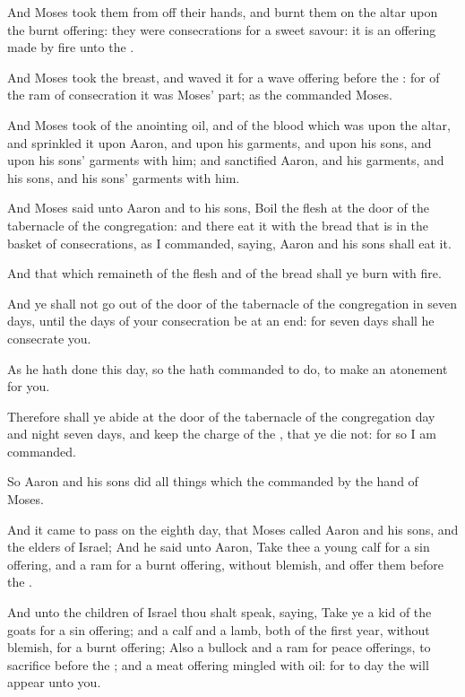\Verse And Moses took them from off their hands, and burnt them on the altar upon the burnt offering: they were consecrations for a sweet savour: it is an offering made by fire unto the \LORD.

\Verse And Moses took the breast, and waved it for a wave offering before the \LORD: for of the ram of consecration it was Moses' part; as the \LORD commanded Moses.

\Verse And Moses took of the anointing oil, and of the blood which was upon the altar, and sprinkled it upon Aaron, and upon his garments, and upon his sons, and upon his sons' garments with him; and sanctified Aaron, and his garments, and his sons, and his sons' garments with him.

\Verse And Moses said unto Aaron and to his sons, Boil the flesh at the door of the tabernacle of the congregation: and there eat it with the bread that is in the basket of consecrations, as I commanded, saying, Aaron and his sons shall eat it.

\Verse And that which remaineth of the flesh and of the bread shall ye burn with fire.

\Verse And ye shall not go out of the door of the tabernacle of the congregation in seven days, until the days of your consecration be at an end: for seven days shall he consecrate you.

\Verse As he hath done this day, so the \LORD hath commanded to do, to make an atonement for you.

\Verse Therefore shall ye abide at the door of the tabernacle of the congregation day and night seven days, and keep the charge of the \LORD, that ye die not: for so I am commanded.

\Verse So Aaron and his sons did all things which the \LORD commanded by the hand of Moses.

\Chapter
\Verse And it came to pass on the eighth day, that Moses called Aaron and his sons, and the elders of Israel; \Verse And he said unto Aaron, Take thee a young calf for a sin offering, and a ram for a burnt offering, without blemish, and offer them before the \LORD.

\Verse And unto the children of Israel thou shalt speak, saying, Take ye a kid of the goats for a sin offering; and a calf and a lamb, both of the first year, without blemish, for a burnt offering; \Verse Also a bullock and a ram for peace offerings, to sacrifice before the \LORD; and a meat offering mingled with oil: for to day the \LORD will appear unto you.

